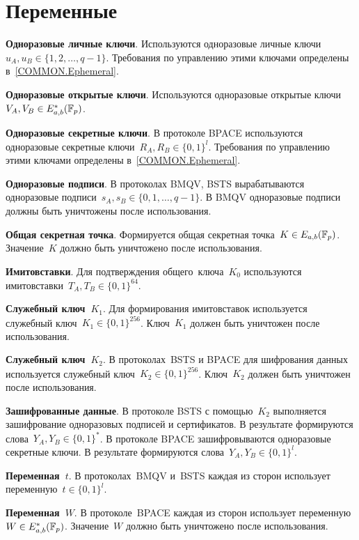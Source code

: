 \section{Переменные}\label{VARS}

{\bf Одноразовые личные ключи}.
Используются одноразовые личные 
ключи~$u_A,u_B\in\{1,2,\ldots,q-1\}$.
Требования по управлению этими ключами 
определены в~\ref{COMMON.Ephemeral}.

{\bf Одноразовые открытые ключи}.
Используются одноразовые открытые 
ключи~$V_A,V_B\in E_{a,b}^*(\mathbb{F}_p)$.
                                                  
{\bf Одноразовые секретные ключи}.
В протоколе BPACE
используются одноразовые секретные 
ключи~$R_A,R_B\in\{0,1\}^{l}$.
Требования по управлению этими ключами 
определены в~\ref{COMMON.Ephemeral}.

{\bf Одноразовые подписи}. 
В протоколах BMQV, BSTS вырабатываются одноразовые 
подписи~$s_A,s_B\in\{0,1,\ldots,q-1\}$.
В BMQV одноразовые подписи должны быть уничтожены после
использования.

{\bf Общая секретная точка}. 
Формируется общая секретная 
точка~$K\in E_{a,b}(\mathbb{F}_p)$.
Значение~$K$ должно быть уничтожено
после использования.

{\bf Имитовставки}. 
Для подтверждения общего~ключа~$K_0$ 
используются имитовставки~$T_A,T_B\in\{0,1\}^{64}$.

{\bf Служебный ключ~$K_1$}. 
Для формирования имитовставок 
используется служебный ключ~$K_1\in\{0,1\}^{256}$.
Ключ~$K_1$ должен быть уничтожен
после использования.

{\bf Служебный ключ~$K_2$}.                             
В протоколах~BSTS и BPACE для шифрования данных 
используется служебный ключ~$K_2\in\{0,1\}^{256}$.
Ключ~$K_2$ должен быть уничтожен
после использования.

{\bf Зашифрованные данные}. 
В протоколе BSTS с помощью~$K_2$ выполняется 
зашифрование одноразовых подписей и сертификатов. 
В результате формируются слова~$Y_A,Y_B\in\{0,1\}^*$.
%
В протоколе BPACE зашифровываются одноразовые секретные ключи.
В результате формируются слова~$Y_A,Y_B\in\{0,1\}^l$.

{\bf Переменная~$t$}. 
В протоколах~BMQV и~BSTS каждая из сторон использует 
переменную~$t\in\{0,1\}^l$.

{\bf Переменная~$W$}. 
В протоколе~BPACE каждая из сторон использует 
переменную~$W\in E_{a,b}^*(\mathbb{F}_p)$.
%
Значение~$W$ должно быть уничтожено после использования.


